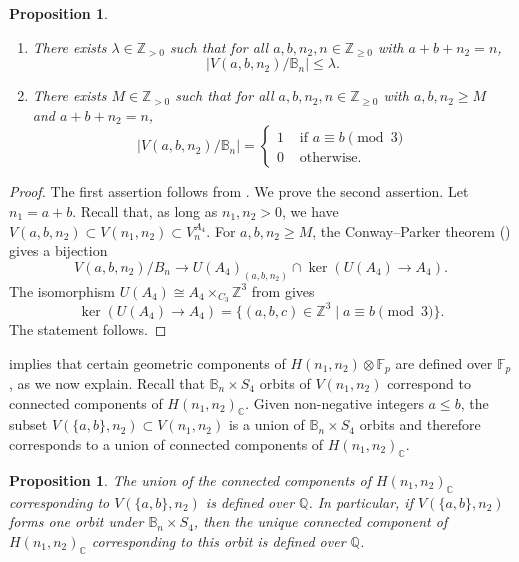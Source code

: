 \documentclass{amsart}
\numberwithin{equation}{section} \numberwithin{figure}{section}
\newcommand\FF{\mathbb{F}}
\newcommand\ZZ{\mathbb{Z}}
\newcommand\QQ{\mathbb{Q}}
\newcommand\CC{\mathbb{C}}
\theoremstyle{one}
\newtheorem{proposition}[theorem]{\textbf{Proposition}}
\theoremstyle{definition}
\begin{document}
\begin{proposition}\label{prop:cpa4}
  \begin{enumerate}
  \item There exists $\lambda\in\mathbb{Z}_{>0}$ such that for all \(a,b,n_2,n \in \ZZ_{\geq 0}\) with $a+b+n_2=n$, 
    \[ |V(a,b,n_2)/{\mathbb{B}_n}| \leq \lambda.\]
   \item There exists $M\in\mathbb{Z}_{>0}$ such that for all \(a,b,n_2, n \in \ZZ_{\geq 0}\) with \(a,b,n_2 \geq M\) and $a+b+n_2=n$,
    \[ |V(a,b,n_2)/{\mathbb{B}_n}| = \begin{cases} 1 & \text{ if } a \equiv b \pmod 3 \\
    0 &\text{ otherwise.}
  \end{cases}\]
  \end{enumerate}
\end{proposition}
\begin{proof}
  The first assertion follows from 
  \cite[Lemma~3.3]{ell.ven:05}.
  We prove the second assertion. Let $n_1=a+b$.
  Recall that, as long as \(n_1, n_2 > 0\), we have \(V(a,b,n_2)\subset V(n_1,n_2) \subset V^{A_4}_n\).
  For \(a,b,n_2 \geq M\), the Conway--Parker theorem () gives a bijection
 \[V(a,b,n_2)/B_n \to U(A_4)_{(a,b,n_2)}\cap \ker(U(A_4) \to A_4).\] 
  The isomorphism \(U(A_4) \cong A_4 \times_{C_3} \ZZ^3 \) from  gives
  \[ \ker(U(A_4) \to A_4) = \{(a,b,c) \in \ZZ^3 \mid a \equiv b \pmod 3\}.\]
  The statement follows.  
\end{proof}
 implies that certain geometric components of \(H(n_1,n_2) \otimes \FF_p\) are defined over \(\FF_p\), as we now explain.
Recall that \({\mathbb{B}_n} \times S_4\) orbits of \(V(n_1,n_2)\) correspond to connected components of \(H(n_1,n_2)_{\CC}\).
Given non-negative integers \(a \leq b\), the subset \(V(\{a,b\}, n_2) \subset V(n_1,n_2)\) is a union of \({\mathbb{B}_n} \times S_4\) orbits and therefore corresponds to a union of connected components of \(H(n_1,n_2)_{\CC}\).


\begin{proposition}\label{prop:components-defined-over-Q}
  The union of the connected components of \(H(n_1,n_2)_{\CC}\) corresponding to \(V(\{a,b\}, n_2)\) is defined over \(\QQ\).
  In particular, if \(V(\{a,b\}, n_2)\) forms one orbit under \({\mathbb{B}_n} \times S_4\), then the unique connected component of \(H(n_1,n_2)_{\CC}\) corresponding to this orbit is defined over \(\QQ\).
\end{proposition}
\end{document}

